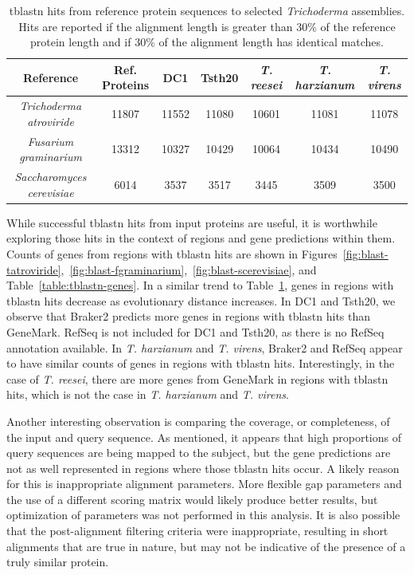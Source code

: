 \begin{table}
  \centering
  \begin{tabular}{|c|c|c|c|c|c|c|}
    \hline
    Reference & Ref. Proteins & DC1 & Tsth20 & \textit{T. reesei} & \textit{T. harzianum} & \textit{T. virens}  \\ \hline
    \textit{Trichoderma atroviride} & 11807 & 11552 & 11080 & 10601 & 11081 & 11078 \\ \hline 
    \textit{Fusarium graminarium} & 13312 & 10327 & 10429 & 10064 & 10434 & 10490 \\ \hline
    \textit{Saccharomyces cerevisiae} & 6014 & 3537 & 3517 & 3445 & 3509 & 3500 \\ \hline
  \end{tabular}
  \caption[Overview of tblastn alignments]{tblastn hits from reference protein sequences to selected
    \textit{Trichoderma} assemblies. Hits are reported if the
    alignment length is greater than 30\% of the reference protein
    length and if 30\% of the alignment length has identical
    matches.}\label{table:tblastn-prots}
\end{table}

While successful tblastn hits from input proteins are useful, it is
worthwhile exploring those hits in the context of regions and gene
predictions within them. Counts of genes from regions with tblastn
hits are shown in Figures~\ref{fig:blast-tatroviride},~\ref{fig:blast-fgraminarium},~\ref{fig:blast-scerevisiae}, and Table~\ref{table:tblastn-genes}. In a similar trend
to Table~\ref{table:tblastn-prots}, genes in regions with tblastn hits
decrease as evolutionary distance increases. In DC1 and Tsth20, we
observe that Braker2 predicts more genes in regions with tblastn hits
than GeneMark. RefSeq is not included for DC1 and Tsth20, as there is
no RefSeq annotation available. In \textit{T. harzianum} and
\textit{T. virens}, Braker2 and RefSeq appear to have similar counts
of genes in regions with tblastn hits. Interestingly, in the case of
\textit{T. reesei}, there are more genes from GeneMark in regions with
tblastn hits, which is not the case in \textit{T. harzianum} and
\textit{T. virens}.

Another interesting observation is comparing the coverage, or
completeness, of the input and query sequence. As mentioned, it
appears that high proportions of query sequences are being mapped to
the subject, but the gene predictions are not as well represented in
regions where those tblastn hits occur. A likely reason for this is
inappropriate alignment parameters. More flexible gap parameters and
the use of a different scoring matrix would likely produce better
results, but optimization of parameters was not performed in this
analysis. It is also possible that the post-alignment filtering
criteria were inappropriate, resulting in short alignments that are
true in nature, but may not be indicative of the presence of a truly
similar protein.

